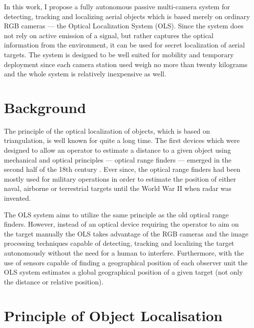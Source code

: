 In this work, I propose a fully autonomous passive multi-camera system for detecting, tracking and localizing aerial objects which is based merely on ordinary RGB cameras --- the Optical Localization System (OLS). Since the system does not rely on active emission of a signal, but rather captures the optical information from the environment, it can be used for secret localization of aerial targets. The system is designed to be well suited for mobility and temporary deployment since each camera station used weigh no more than twenty kilograms and the whole system is relatively inexpensive as well.


\section{Background} \label{txt:background}

The principle of the optical localization of objects, which is based on triangulation, is well known for quite a long time. The first devices which were designed to allow an operator to estimate a distance to a given object using mechanical and optical principles --- optical range finders --- emerged in the second half of the 18th century \cite{bud1998instruments}. Ever since, the optical range finders had been mostly used for military operations in order to estimate the position of either naval, airborne or terrestrial targets until the World War II when radar was invented.

The OLS system aims to utilize the same principle as the old optical range finders. However, instead of an optical device requiring the operator to aim on the target manually the OLS takes advantage of the RGB cameras and the image processing techniques capable of detecting, tracking and localizing the target autonomously without the need for a human to interfere. Furthermore, with the use of sensors capable of finding a geographical position of each observer unit the OLS system estimates a global geographical position of a given target (not only the distance or relative position).

\section{Principle of Object Localisation}


